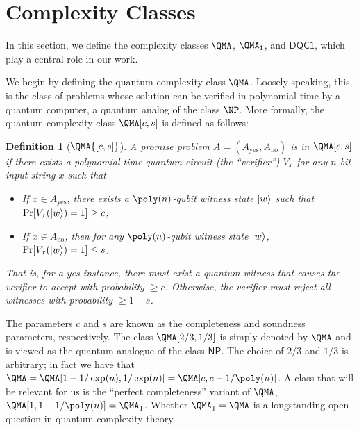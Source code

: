 \documentclass[11pt]{article}
\numberwithin{equation}{section}
\newcommand{\DQC}{\mathsf{DQC1}}
\renewcommand\( {\left(}
\renewcommand\) {\right)}
\newtheorem{definition}{Definition}
\begin{document}
\newpage 

\appendix

\section{Complexity Classes}\label{app:complexity_classes}
In this section, we define the complexity classes $\QMA$, $\QMA_1$, and $\DQC$, which play a central role in our work.

We begin by defining the quantum complexity class  $\QMA$. Loosely speaking, this is the class of problems whose solution can be verified in polynomial time by a quantum computer, a  quantum analog of the class $\NP$. More formally, the quantum complexity class $\QMA[c,s]$ is defined as follows:
%
\begin{definition}[$\QMA {[c,s]}$]
A promise problem $A = (A_{\text{yes}}, A_{\text{no}})$ is in $\QMA [c,s]$ if there exists a polynomial-time quantum circuit (the ``verifier'') $V_x$ for any $n$-bit input string $x$ such that
\begin{itemize}
	\item If $x \in A_{\text{yes}}$, there exists a $\poly(n)$-qubit witness state $\ket{w}$ such that $\Pr[V_x(\ket{w}) = 1] \geq c$,
	\item If $x \in A_{\text{no}}$, then for any $\poly(n)$-qubit witness state $\ket{w}$, $\Pr[V_x(\ket{w}) = 1] \leq s$.
\end{itemize}
That is,  for a yes-instance, there must exist a quantum witness that causes the verifier to accept with probability $\geq c$. Otherwise, the verifier must reject all witnesses with probability $\geq 1- s$. 
\end{definition}

The parameters $c$ and $s$ are known as the completeness and soundness parameters, respectively.  The class $\QMA[2/3,1/3]$ is simply denoted by $\QMA$ and is viewed as the quantum analogue of the class $\mathsf{NP}$. The choice of $2/3$ and $1/3$ is arbitrary; in fact we have that $\QMA = \QMA[1-1/\exp(n), 1/\exp(n)] = \QMA[c, c-1/\poly(n)]$. A class that will be relevant for us is the ``perfect completeness'' variant of $\QMA$, $\QMA[1,1-1/\poly(n)] = \QMA_1$. Whether $\QMA_1 = \QMA$ is a longstanding open question in quantum complexity theory.\\
\end{document}
